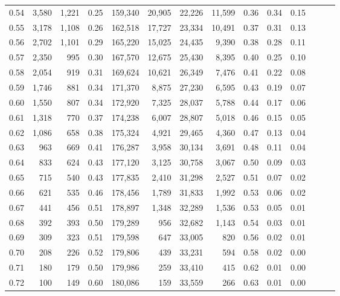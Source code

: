 \begin{tabular}{rrrrrrrrrrrrrr}
0.54 &  3,580 &  1,221 &  0.25 &  159,340 &   20,905 &  22,226 &  11,599 &  0.36 &  0.34 &      0.15 \\
0.55 &  3,178 &  1,108 &  0.26 &  162,518 &   17,727 &  23,334 &  10,491 &  0.37 &  0.31 &      0.13 \\
0.56 &  2,702 &  1,101 &  0.29 &  165,220 &   15,025 &  24,435 &   9,390 &  0.38 &  0.28 &      0.11 \\
0.57 &  2,350 &    995 &  0.30 &  167,570 &   12,675 &  25,430 &   8,395 &  0.40 &  0.25 &      0.10 \\
0.58 &  2,054 &    919 &  0.31 &  169,624 &   10,621 &  26,349 &   7,476 &  0.41 &  0.22 &      0.08 \\
0.59 &  1,746 &    881 &  0.34 &  171,370 &    8,875 &  27,230 &   6,595 &  0.43 &  0.19 &      0.07 \\
0.60 &  1,550 &    807 &  0.34 &  172,920 &    7,325 &  28,037 &   5,788 &  0.44 &  0.17 &      0.06 \\
0.61 &  1,318 &    770 &  0.37 &  174,238 &    6,007 &  28,807 &   5,018 &  0.46 &  0.15 &      0.05 \\
0.62 &  1,086 &    658 &  0.38 &  175,324 &    4,921 &  29,465 &   4,360 &  0.47 &  0.13 &      0.04 \\
0.63 &    963 &    669 &  0.41 &  176,287 &    3,958 &  30,134 &   3,691 &  0.48 &  0.11 &      0.04 \\
0.64 &    833 &    624 &  0.43 &  177,120 &    3,125 &  30,758 &   3,067 &  0.50 &  0.09 &      0.03 \\
0.65 &    715 &    540 &  0.43 &  177,835 &    2,410 &  31,298 &   2,527 &  0.51 &  0.07 &      0.02 \\
0.66 &    621 &    535 &  0.46 &  178,456 &    1,789 &  31,833 &   1,992 &  0.53 &  0.06 &      0.02 \\
0.67 &    441 &    456 &  0.51 &  178,897 &    1,348 &  32,289 &   1,536 &  0.53 &  0.05 &      0.01 \\
0.68 &    392 &    393 &  0.50 &  179,289 &      956 &  32,682 &   1,143 &  0.54 &  0.03 &      0.01 \\
0.69 &    309 &    323 &  0.51 &  179,598 &      647 &  33,005 &     820 &  0.56 &  0.02 &      0.01 \\
0.70 &    208 &    226 &  0.52 &  179,806 &      439 &  33,231 &     594 &  0.58 &  0.02 &      0.00 \\
0.71 &    180 &    179 &  0.50 &  179,986 &      259 &  33,410 &     415 &  0.62 &  0.01 &      0.00 \\
0.72 &    100 &    149 &  0.60 &  180,086 &      159 &  33,559 &     266 &  0.63 &  0.01 &      0.00 \\

\end{tabular}
